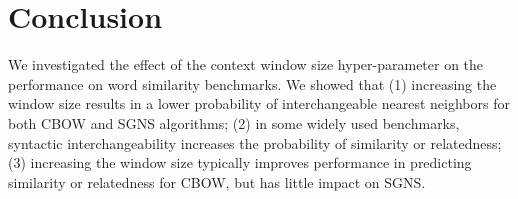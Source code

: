 \documentclass[11pt,a4paper]{article}
\begin{document}
    
    

\section{Conclusion}\label{sec:conclusion}

    We investigated the effect of the context window size hyper-parameter
    on the performance on word similarity benchmarks.
    We showed that
    (1) increasing the window size results in a lower probability of interchangeable
    nearest neighbors for both CBOW and SGNS algorithms;
    (2) in some widely used benchmarks,
    syntactic interchangeability increases the probability of similarity or relatedness;
    (3) increasing the window size typically improves performance
    in predicting similarity or relatedness for CBOW,
    but has little impact on SGNS.
    
\end{document}
